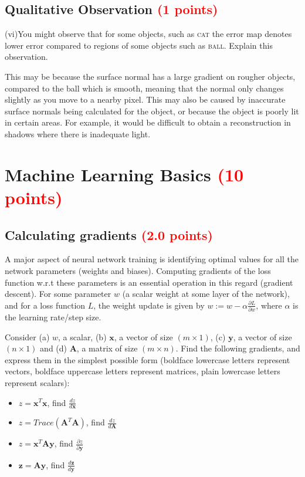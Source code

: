 \documentclass[answers]{exam}
\newcommand{\mypoints}[1]{\textcolor{red}{(#1 points)}}
\begin{document}
\subsection{Qualitative Observation \mypoints{1}}
(vi)You might observe that for some objects, such as \textsc{cat} the error map denotes lower error compared to regions of some objects such as \textsc{ball}. Explain this observation. 
\begin{solution}
This may be because the surface normal has a large gradient on rougher objects, compared to the ball which is smooth, meaning that the normal only changes slightly as you move to a nearby pixel. This may also be caused by inaccurate surface normals being calculated for the object, or because the object is poorly lit in certain areas. For example, it would be difficult to obtain a reconstruction in shadows where there is inadequate light.
\end{solution}

\newpage
\section{Machine Learning Basics \mypoints{10}}
\subsection{Calculating gradients \mypoints{2.0}}
A major aspect of neural network training is identifying optimal values for all the network parameters (weights and biases). Computing gradients of the loss function w.r.t these parameters is an essential operation in this regard (gradient descent). For some parameter $w$ (a scalar weight at some layer of the network), and for a loss function $L$, the weight update is given by $w:=w-\alpha\frac{\partial L}{\partial w}$, where $\alpha$ is the learning rate/step size.

Consider (a) $w$, a scalar, (b) $\mathbf{x}$, a vector of size $(m\times 1)$, (c) $\mathbf{y}$, a vector of size $(n\times 1)$ and (d) $\mathbf{A}$, a matrix of size $(m\times n)$. Find the following gradients, and express them in the simplest possible form (boldface lowercase letters represent vectors, boldface uppercase letters represent matrices, plain lowercase letters represent scalars):
\begin{itemize}
    \item $z=\mathbf{x}^{T}\mathbf{x}$, find $\frac{dz}{d\mathbf{x}}$
    \item $z=Trace(\mathbf{A}^{T}\mathbf{A})$, find $\frac{dz}{d\mathbf{A}}$
    \item $z=\mathbf{x}^{T}\mathbf{A}\mathbf{y}$, find $\frac{\partial z}{\partial\mathbf{y}}$
    \item $\mathbf{z}=\mathbf{A}\mathbf{y}$, find $\frac{d\mathbf{z}}{d\mathbf{y}}$
\end{itemize}
\end{document}

